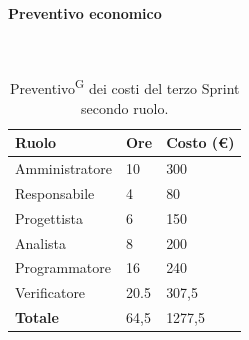 \documentclass[8pt]{article}
\newcommand{\glossterm}[1]{#1\textsuperscript{G}} %
\newcommand{\subsubsubsection}[1]{\paragraph{#1}\mbox{}\\}
\begin{document}
\subsubsubsection{Preventivo economico}
\begin{table}[ht!]
	\centering
	\begin{tabular}{p{4cm} p{1cm} p{2cm}}
        \toprule
        \textbf{Ruolo} & \textbf{Ore} & \textbf{Costo (€)} \\
        \midrule
        Amministratore & 10 & 300 \\
        Responsabile & 4 & 80 \\
        Progettista & 6 & 150 \\
        Analista & 8 & 200 \\
        Programmatore & 16 & 240 \\
        Verificatore & 20.5 & 307,5 \\
        \bottomrule
        \textbf{Totale} & 64,5 & 1277,5
    \end{tabular}
    \caption{\glossterm{Preventivo} dei costi del terzo Sprint secondo ruolo.}
	\label{table:Preventivo dei costi del terzo Sprint secondo ruolo}
\end{table}
\end{document}
